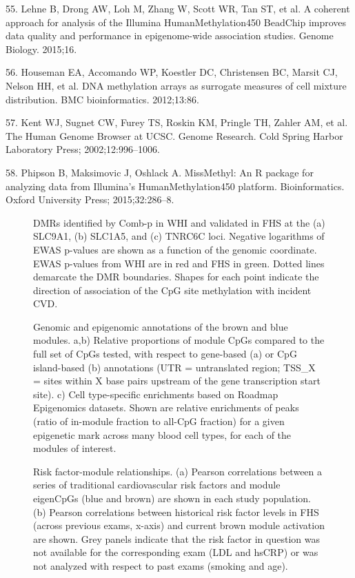 \documentclass[]{bmcart}
\theoremstyle{definition}
\theoremstyle{definition}
\theoremstyle{definition}
\theoremstyle{remark}
\begin{document}
55. Lehne B, Drong AW, Loh M, Zhang W, Scott WR, Tan ST, et al. A
coherent approach for analysis of the Illumina HumanMethylation450
BeadChip improves data quality and performance in epigenome-wide
association studies. Genome Biology. 2015;16.

56. Houseman EA, Accomando WP, Koestler DC, Christensen BC, Marsit CJ,
Nelson HH, et al. DNA methylation arrays as surrogate measures of cell
mixture distribution. BMC bioinformatics. 2012;13:86.

57. Kent WJ, Sugnet CW, Furey TS, Roskin KM, Pringle TH, Zahler AM, et
al. The Human Genome Browser at UCSC. Genome Research. Cold Spring
Harbor Laboratory Press; 2002;12:996--1006.

58. Phipson B, Maksimovic J, Oshlack A. MissMethyl: An R package for
analyzing data from Illumina's HumanMethylation450 platform.
Bioinformatics. Oxford University Press; 2015;32:286--8.

\begin{figure}[htbp]
\centering
\caption{\label{fig:print-combp-plots}DMRs identified by Comb-p in WHI and
validated in FHS at the (a) SLC9A1, (b) SLC1A5, and (c) TNRC6C loci.
Negative logarithms of EWAS p-values are shown as a function of the
genomic coordinate. EWAS p-values from WHI are in red and FHS in green.
Dotted lines demarcate the DMR boundaries. Shapes for each point
indicate the direction of association of the CpG site methylation with
incident CVD.}
\end{figure}

\begin{figure}[htbp]
\centering
\caption{\label{fig:brown-and-blue-plots}Genomic and epigenomic annotations
of the brown and blue modules. a,b) Relative proportions of module CpGs
compared to the full set of CpGs tested, with respect to gene-based (a)
or CpG island-based (b) annotations (UTR = untranslated region; TSS\_X =
sites within X base pairs upstream of the gene transcription start
site). c) Cell type-specific enrichments based on Roadmap Epigenomics
datasets. Shown are relative enrichments of peaks (ratio of in-module
fraction to all-CpG fraction) for a given epigenetic mark across many
blood cell types, for each of the modules of interest.}
\end{figure}

\begin{figure}[htbp]
\centering
\caption{\label{fig:risk-factor-correlation-plots}Risk factor-module
relationships. (a) Pearson correlations between a series of traditional
cardiovascular risk factors and module eigenCpGs (blue and brown) are
shown in each study population. (b) Pearson correlations between
historical risk factor levels in FHS (across previous exams, x-axis) and
current brown module activation are shown. Grey panels indicate that
the risk factor in question was not available for the corresponding exam
(LDL and hsCRP) or was not analyzed with respect to past exams (smoking
and age).}
\end{figure}
\end{document}
